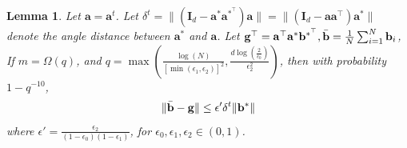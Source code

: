 \documentclass{article}
\theoremstyle{plain}
\newtheorem{lemma}[theorem]{Lemma}
\theoremstyle{definition}
\theoremstyle{remark}
\begin{document}
\begin{lemma} \label{lemma:b-bar-g-bound}
    Let $\mathbf{a} = \mathbf{a}^t$. Let $\delta^t = \lVert (\mathbf{I}_d-\mathbf{a}^*\mathbf{a}^{*^\top})\mathbf{a}\rVert = \lVert (\mathbf{I}_d-\mathbf{a}\mathbf{a}^\top)\mathbf{a}^*\rVert$ denote the angle distance between $\mathbf{a}^{*}$ and $\mathbf{a}$. Let $\mathbf{g}^\top = \mathbf{a}^\top\mathbf{a}^* \mathbf{b}^{*^\top}, \Bar{\mathbf{b}} = \frac{1}{N}\sum_{i=1}^N{\mathbf{b}}_i$, If $m=\Omega(q)$, and $q=\max(\frac{\log(N)}{[\min(\epsilon_1,\epsilon_2)]^2},\frac{d\log(\frac{2}{\epsilon_0})}{\epsilon_2^2})$, then with probability $1-q^{-10}$,
    \begin{align}\label{eq:b_bar_g_diff}
        \lVert \Bar{\mathbf{b}}-\mathbf{g}\rVert \le \epsilon' \delta^t \lVert \mathbf{b}^* \rVert
    \end{align}
    where $\epsilon' = \frac{\epsilon_2}{(1-\epsilon_0)(1-\epsilon_{1})}$, for $\epsilon_0,\epsilon_1,\epsilon_2 \in (0,1)$.
\end{lemma}
\end{document}
